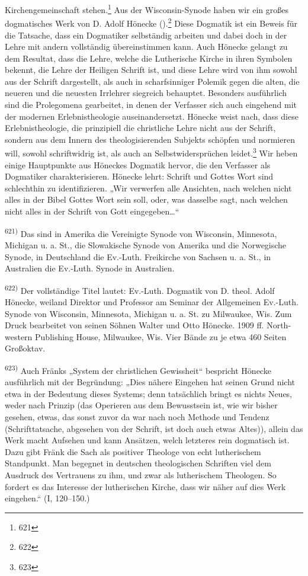 Kirchengemeinschaft stehen.\footnote{621} Aus der Wisconsin-Synode haben wir ein großes dogmatisches Werk von D. Adolf Hönecke ().\footnote{622} Diese Dogmatik ist ein Beweis für die Tatsache, dass ein Dogmatiker selbständig arbeiten und dabei doch in der Lehre mit andern vollständig übereinstimmen kann. Auch Hönecke gelangt zu dem Resultat, dass die Lehre, welche die Lutherische Kirche in ihren Symbolen bekennt, die Lehre der Heiligen Schrift ist, und diese Lehre wird von ihm sowohl aus der Schrift dargestellt, als auch in scharfsinniger Polemik gegen die alten, die neueren und die neuesten Irrlehrer siegreich behauptet. Besonders ausführlich sind die Prolegomena gearbeitet, in denen der Verfasser sich auch eingehend mit der modernen Erlebnistheologie auseinandersetzt. Hönecke weist nach, dass diese Erlebnistheologie, die prinzipiell die christliche Lehre nicht aus der Schrift, sondern aus dem Innern des theologisierenden Subjekts schöpfen und normieren will, sowohl schriftwidrig ist, als auch an Selbstwidersprüchen leidet.\footnote{623} Wir heben einige Hauptpunkte aus Höneckes Dogmatik hervor, die den Verfasser als Dogmatiker charakterisieren. Hönecke lehrt: Schrift und Gottes Wort sind schlechthin zu identifizieren. „Wir verwerfen alle Ansichten, nach welchen nicht alles in der Bibel Gottes Wort sein soll, oder, was dasselbe sagt, nach welchen nicht alles in der Schrift von Gott eingegeben\ldots“\par\vspace*{\fill}\footnotesize\noindent\textsuperscript{621)} Das sind in Amerika die Vereinigte Synode von Wisconsin, Minnesota, Michigan u. a. St., die Slowakische Synode von Amerika und die Norwegische Synode, in Deutschland die Ev.-Luth. Freikirche von Sachsen u. a. St., in Australien die Ev.-Luth. Synode in Australien.\par\noindent\textsuperscript{622)} Der vollständige Titel lautet: Ev.-Luth. Dogmatik von D. theol. Adolf Hönecke, weiland Direktor und Professor am Seminar der Allgemeinen Ev.-Luth. Synode von Wisconsin, Minnesota, Michigan u. a. St. zu Milwaukee, Wis. Zum Druck bearbeitet von seinen Söhnen Walter und Otto Hönecke. 1909 ff. North-western Publishing House, Milwaukee, Wis. Vier Bände zu je etwa 460 Seiten Großoktav.\par\noindent\textsuperscript{623)} Auch Fränks „System der christlichen Gewissheit“ bespricht Hönecke ausführlich mit der Begründung: „Dies nähere Eingehen hat seinen Grund nicht etwa in der Bedeutung dieses Systems; denn tatsächlich bringt es nichts Neues, weder nach Prinzip (das Operieren aus dem Bewusstsein ist, wie wir bisher gesehen, etwas, das sonst zuvor da war nach noch Methode und Tendenz (Schrifttatsache, abgesehen von der Schrift, ist doch auch etwas Altes)), allein das Werk macht Aufsehen und kann Ansätzen, welch letzteres rein dogmatisch ist. Dazu gibt Fränk die Sach als positiver Theologe von echt lutherischem Standpunkt. Man begegnet in deutschen theologischen Schriften viel dem Ausdruck des Vertrauens zu ihm, und zwar als lutherischem Theologen. So fordert es das Interesse der lutherischen Kirche, dass wir näher auf dies Werk eingehen.“ (I, 120--150.)